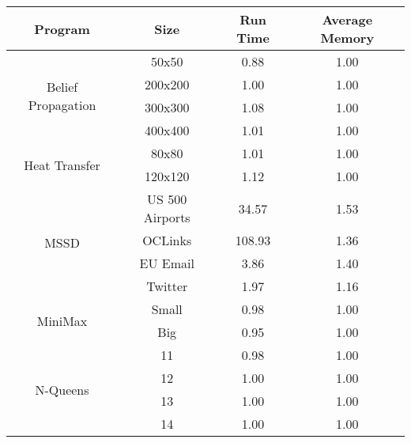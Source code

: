 \begin{tabular}{c | c || c | c} \hline
	\textbf{Program} & \textbf{Size} & \textbf{Run Time} & \textbf{Average Memory}\\ \hline \hline
	\multirow{4}{*}{Belief Propagation}  & 50x50 &  0.88  &  1.00
  \\
		 & 200x200 &  1.00  &  1.00
  \\
		 & 300x300 &  1.08  &  1.00
  \\
		 & 400x400 &  1.01  &  1.00
  \\
	\hline
	\multirow{2}{*}{Heat Transfer}  & 80x80 &  1.01  &  1.00
  \\
		 & 120x120 &  1.12  &  1.00
  \\
	\hline
	\multirow{4}{*}{MSSD}  & US 500 Airports &  34.57  &  1.53
  \\
		 & OCLinks &  108.93  &  1.36
  \\
		 & EU Email &  3.86  &  1.40
  \\
		 & Twitter &  1.97  &  1.16
  \\
	\hline
	\multirow{2}{*}{MiniMax}  & Small &  0.98  &  1.00
  \\
		 & Big &  0.95  &  1.00
  \\
	\hline
	\multirow{4}{*}{N-Queens}  & 11 &  0.98  &  1.00
  \\
		 & 12 &  1.00  &  1.00
  \\
		 & 13 &  1.00  &  1.00
  \\
		 & 14 &  1.00  &  1.00
  \\
	\hline
\end{tabular}
